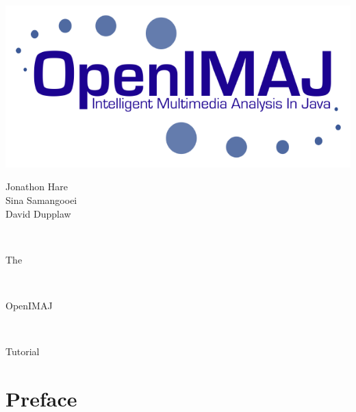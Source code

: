 \documentclass[10pt,a4paper,twoside,extrafontsizes]{memoir}
\newlength\titlepage
\newlength\titlepagefull
\begin{document}
	
\pagestyle{empty}

\begin{minipage}{0.5\titlepage}
\includegraphics{OpenIMAJ.png}
\end{minipage}
\hspace{0.001pt}
\begin{minipage}{0.5\titlepage}
\Huge
\flushright
Jonathon Hare\\
Sina Samangooei\\
David Dupplaw
\end{minipage}
\\[10cm]
\begin{minipage}{\titlepage}
\fontsize{60}{100}\selectfont\flushright The
\end{minipage}
\\[1cm]
\colorbox{nicered}{\parbox{\titlepagefull}{
	\parbox{\titlepage}{
		\color{white}\fontsize{80}{120}\selectfont\flushright OpenIMAJ\\[0.4cm]}
	}
}
\\[0.8cm]
\begin{minipage}{\titlepage}
\fontsize{60}{100}\selectfont\flushright Tutorial
\end{minipage}
\cleardoublepage


\tableofcontents*

\chapter*{Preface}\normalsize
{}
\pagestyle{plain}
\end{document}
